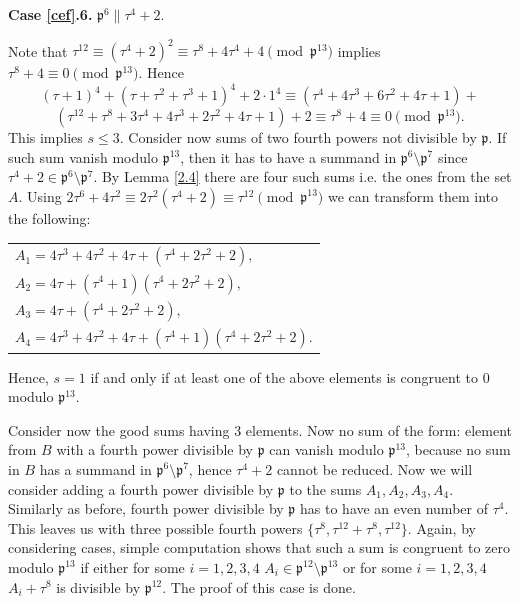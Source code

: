 \documentclass[12pt]{article}
\theoremstyle{remark}
\newcommand{\p}{\mathfrak{p}}
\begin{document}


\textbf{Case \ref{cef}.6.} $\mathfrak{p}^6 \parallel \tau^4+2$.

Note that $\tau^{12} \equiv (\tau^4+2)^2 \equiv \tau^8 + 4\tau^4+4 \pmod{\mathfrak{p}^{13}}$ implies $\tau^8+4 \equiv 0 \pmod{\mathfrak{p}^{13}}$. Hence
\[ (\tau+1)^4+(\tau+\tau^2+\tau^3+1)^4+2 \cdot 1^4 \equiv (\tau^4+4\tau^3+6\tau^2+4\tau+1) + \] 
\[(\tau^{12}+\tau^8+3\tau^4+4\tau^3+2\tau^2+4\tau+1) + 2 \equiv \tau^8+4 \equiv 0 \pmod{\mathfrak{p}^{13}}. \]
This implies $s \leq 3$. Consider now sums of two fourth powers not divisible by $\p$. If such sum vanish modulo $\p^{13}$, then it has to have a summand in $\p^6\setminus \p^7$ since $\tau^4+2 \in \p^6\setminus \p^7$. By Lemma \ref{2.4} there are four such sums i.e. the ones from the set $A$. Using $2\tau^6+4\tau^2 \equiv 2\tau^2(\tau^4+2) \equiv \tau^{12} \pmod{\mathfrak{p}^{13}}$ we can transform them into the following:  
\begin{center}
\begin{tabular}{@{}l@{}}
    $A_1 = 4\tau^3+4\tau^2+4\tau+(\tau^4+2\tau^2+2),$\\
    $A_2 = 4\tau + (\tau^4+1)(\tau^4+2\tau^2+2),$\\
    $A_3 = 4\tau + (\tau^4+2\tau^2+2), $\\
    $A_4= 4\tau^3+4\tau^2+4\tau+(\tau^4+1)(\tau^4+2\tau^2+2). $
\end{tabular}
\end{center}
Hence, $s=1$ if and only if at least one of the above elements is congruent to 0 modulo $\mathfrak{p}^{13}$.


Consider now the good sums having 3 elements. Now no sum of the form: element from $B$ with a fourth power divisible by $\p$ can vanish modulo $\p^{13}$, because no sum in $B$ has a summand in $\p^6 \setminus \p^7$, hence $\tau^4+2$ cannot be reduced. Now we will consider adding a fourth power divisible by $\p$ to the sums $A_1,A_2,A_3,A_4$. Similarly as before, fourth power divisible by $\p$ has to have an even number of $\tau^4$. This leaves us with three possible fourth powers $\{\tau^8, \tau^{12}+\tau^8, \tau^{12}\}$.
Again, by considering cases, simple computation shows that such a sum is congruent to zero modulo $\p^{13}$ if either for some $i=1,2,3,4$ $A_i \in \p^{12}\setminus \p^{13}$ or for some $i=1,2,3,4$ $A_i+\tau^8$ is divisible by $\p^{12}$. The proof of this case is done.
\end{document}
